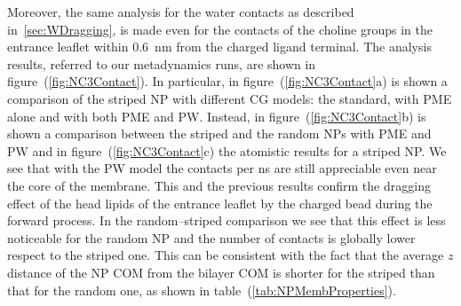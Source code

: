 Moreover, the same analysis for the water contacts as described in~\ref{sec:WDragging}, is made even for the contacts of the choline groups in the entrance leaflet within $0.6$~nm from the charged ligand terminal. The analysis results, referred to our metadynamics runs, are shown in figure~(\ref{fig:NC3Contact}). In particular, in figure~(\ref{fig:NC3Contact}a) is shown a comparison of the striped \ac{NP} with different \ac{CG} \martini models: the standard, with \ac{PME} alone and with both \ac{PME} and \ac{PW}. Instead, in figure~(\ref{fig:NC3Contact}b) is shown a comparison between the striped and the random \acp{NP} with \ac{PME} and \ac{PW} and in figure~(\ref{fig:NC3Contact}c) the atomistic results for a striped \ac{NP}. We see that with the \ac{PW} model the contacts per ns are still appreciable even near the core of the membrane. This and the previous results confirm the dragging effect of the head lipids of the entrance leaflet by the charged bead during the forward process. In the random--striped comparison we see that this effect is less noticeable for the random \ac{NP} and the number of contacts is globally lower respect to the striped one. This can be consistent with the fact that the average $z$ distance of the \ac{NP} \ac{COM} from the bilayer \ac{COM} is shorter for the striped than that for the random one, as shown in table~(\ref{tab:NPMembProperties}). 

